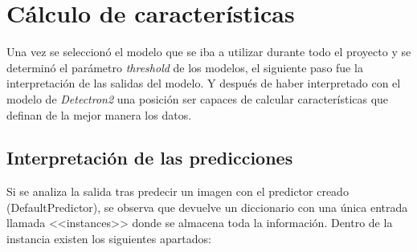 \section{Cálculo de características}
Una vez se seleccionó el modelo que se iba a utilizar durante todo el proyecto y se determinó el parámetro \textit{threshold} de los modelos, el siguiente paso fue la interpretación de las salidas del modelo. Y después de haber interpretado con el modelo de \textit{Detectron2} una posición ser capaces de calcular características que definan de la mejor manera los datos.
\subsection{Interpretación de las predicciones}
Si se analiza la salida tras predecir un imagen con el predictor creado (DefaultPredictor), se observa que devuelve un diccionario con una única entrada llamada <<instances>> donde se almacena toda la información. Dentro de la instancia existen los siguientes apartados:
